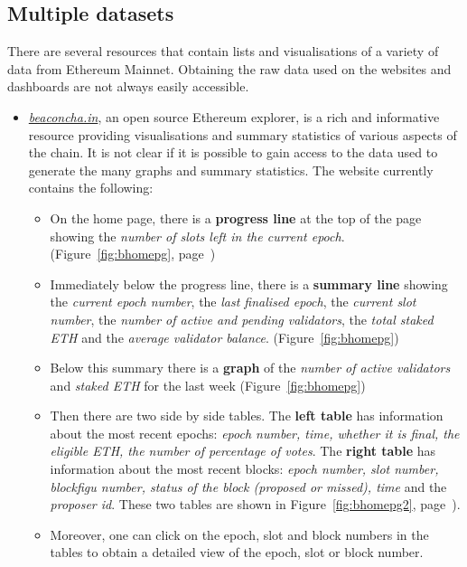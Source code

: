 \documentclass[UTF8]{article}
\begin{document}
\subsection{Multiple datasets}
There are several resources that contain lists and visualisations of a variety of data from Ethereum Mainnet. Obtaining the raw data used on the websites and dashboards are not always easily accessible.
\label{sec:multiple}
\begin{itemize}
	\item \textit{\href{https://beaconcha.in/}{beaconcha.in}}, an open source Ethereum explorer, is a rich and informative resource providing visualisations and summary statistics of various aspects of the chain. It is not clear if it is possible to gain access to the data used to generate the many graphs and summary statistics. The website currently contains the following:
	\begin{itemize}
		\item On the home page, there is a \textbf{progress line} at the top of the page showing the \textit{number of slots left in the current epoch}. (Figure~\ref{fig:bhomepg}, page~\pageref{fig:bhomepg})
		\item Immediately below the progress line, there is a \textbf{summary line} showing the \textit{current epoch number}, the \textit{last finalised epoch}, the \textit{current slot number}, the \textit{number of active and pending validators}, the \textit{total staked ETH} and the \textit{average validator balance}. (Figure~\ref{fig:bhomepg})
		\item Below this summary there is a \textbf{graph} of the \textit{number of active validators} and \textit{staked ETH} for the last week (Figure~\ref{fig:bhomepg})
		\item Then there are two side by side tables. The \textbf{left table} has information about the most recent epochs: \textit{epoch number, time, whether it is final, the eligible ETH, the number of percentage of votes}. The \textbf{right table} has information about the most recent blocks: \textit{epoch number, slot number, blockfigu number, status of the block (proposed or missed), time} and the \textit{proposer id}. These two tables are shown in Figure~\ref{fig:bhomepg2}, page~\pageref{fig:bhomepg2}).\\
		\item Moreover, one can click on the epoch, slot and block numbers in the tables to obtain a detailed view of the epoch, slot or block number. 

\end{itemize}
\end{itemize}
\end{document}
